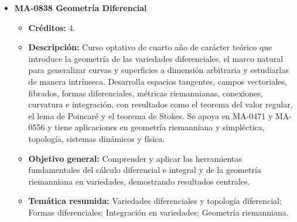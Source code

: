 \begin{itemize}[leftmargin=1.3em, itemsep=10pt, topsep=4pt, label={\color{Azul-UCR}$\blacksquare$}]
\item {\color{Azul-UCR}\textbf{MA-0838 Geometría Diferencial}}\par\nopagebreak\smallskip
\begin{itemize}[leftmargin=1.1em, itemsep=3pt, topsep=2pt, parsep=2pt, label={\textendash}]
\item \textbf{Créditos:} 4.
\item \textbf{Descripción:} Curso optativo de cuarto año de carácter teórico que introduce la geometría de las variedades diferenciales, el marco natural para generalizar curvas y superficies a dimensión arbitraria y estudiarlas de manera intrínseca. Desarrolla espacios tangentes, campos vectoriales, fibrados, formas diferenciales, métricas riemannianas, conexiones, curvatura e integración, con resultados como el teorema del valor regular, el lema de Poincaré y el teorema de Stokes. Se apoya en MA-0471 y MA-0556 y tiene aplicaciones en geometría riemanniana y simpléctica, topología, sistemas dinámicos y física.
\item \textbf{Objetivo general:} Comprender y aplicar las herramientas fundamentales del cálculo diferencial e integral y de la geometría riemanniana en variedades, demostrando resultados centrales.
\item \textbf{Temática resumida:} Variedades diferenciales y topología diferencial; Formas diferenciales; Integración en variedades; Geometría riemanniana.
\end{itemize}


\end{itemize}
